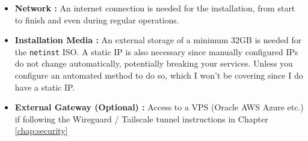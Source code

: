 \begin{itemize}
	\item \textbf{Network :} An internet connection is needed for the installation, from start to finish and even during regular operations.
	\item \textbf{Installation Media :} An external storage of a minimum 32\unit{GB} is needed for the \texttt{netinst} ISO. A static IP is also necessary since manually configured IPs do not change automatically, potentially breaking your services. Unless you configure an automated method to do so, which I won't be covering since I do have a static IP.
	\item \textbf{External Gateway (Optional) :} Access to a VPS (Oracle \/ AWS \/ Azure \/ etc.) if following the Wireguard / Tailscale tunnel instructions in {Chapter }\ref{chap:security}
	
\end{itemize}